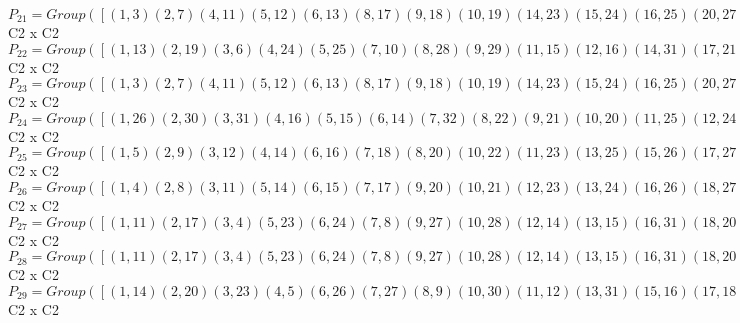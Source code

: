 \documentclass[varwidth=\maxdimen,border=10]{standalone}
\begin{document}
\begin{tabular}
$P_{21} = Group( [ ( 1, 3)( 2, 7)( 4,11)( 5,12)( 6,13)( 8,17)( 9,18)(10,19)(14,23)(15,24)(16,25)(20,27)(21,28)(22,29)(26,31)(30,32), ( 1, 5)( 2, 9)( 3,12)( 4,14)( 6,16)( 7,18)( 8,20)(10,22)(11,23)(13,25)(15,26)(17,27)(19,29)(21,30)(24,31)(28,32) ] )\cong$ C2 x C2\ \\
$P_{22} = Group( [ ( 1,13)( 2,19)( 3, 6)( 4,24)( 5,25)( 7,10)( 8,28)( 9,29)(11,15)(12,16)(14,31)(17,21)(18,22)(20,32)(23,26)(27,30), ( 1, 5)( 2, 9)( 3,12)( 4,14)( 6,16)( 7,18)( 8,20)(10,22)(11,23)(13,25)(15,26)(17,27)(19,29)(21,30)(24,31)(28,32) ] )\cong$ C2 x C2\ \\
$P_{23} = Group( [ ( 1, 3)( 2, 7)( 4,11)( 5,12)( 6,13)( 8,17)( 9,18)(10,19)(14,23)(15,24)(16,25)(20,27)(21,28)(22,29)(26,31)(30,32), ( 1,16)( 2,22)( 3,25)( 4,26)( 5, 6)( 7,29)( 8,30)( 9,10)(11,31)(12,13)(14,15)(17,32)(18,19)(20,21)(23,24)(27,28) ] )\cong$ C2 x C2\ \\
$P_{24} = Group( [ ( 1,26)( 2,30)( 3,31)( 4,16)( 5,15)( 6,14)( 7,32)( 8,22)( 9,21)(10,20)(11,25)(12,24)(13,23)(17,29)(18,28)(19,27), ( 1, 3)( 2, 7)( 4,11)( 5,12)( 6,13)( 8,17)( 9,18)(10,19)(14,23)(15,24)(16,25)(20,27)(21,28)(22,29)(26,31)(30,32) ] )\cong$ C2 x C2\ \\
$P_{25} = Group( [ ( 1, 5)( 2, 9)( 3,12)( 4,14)( 6,16)( 7,18)( 8,20)(10,22)(11,23)(13,25)(15,26)(17,27)(19,29)(21,30)(24,31)(28,32), ( 1, 6)( 2,10)( 3,13)( 4,15)( 5,16)( 7,19)( 8,21)( 9,22)(11,24)(12,25)(14,26)(17,28)(18,29)(20,30)(23,31)(27,32) ] )\cong$ C2 x C2\ \\
$P_{26} = Group( [ ( 1, 4)( 2, 8)( 3,11)( 5,14)( 6,15)( 7,17)( 9,20)(10,21)(12,23)(13,24)(16,26)(18,27)(19,28)(22,30)(25,31)(29,32), ( 1,16)( 2,22)( 3,25)( 4,26)( 5, 6)( 7,29)( 8,30)( 9,10)(11,31)(12,13)(14,15)(17,32)(18,19)(20,21)(23,24)(27,28) ] )\cong$ C2 x C2\ \\
$P_{27} = Group( [ ( 1,11)( 2,17)( 3, 4)( 5,23)( 6,24)( 7, 8)( 9,27)(10,28)(12,14)(13,15)(16,31)(18,20)(19,21)(22,32)(25,26)(29,30), ( 1, 6)( 2,10)( 3,13)( 4,15)( 5,16)( 7,19)( 8,21)( 9,22)(11,24)(12,25)(14,26)(17,28)(18,29)(20,30)(23,31)(27,32) ] )\cong$ C2 x C2\ \\
$P_{28} = Group( [ ( 1,11)( 2,17)( 3, 4)( 5,23)( 6,24)( 7, 8)( 9,27)(10,28)(12,14)(13,15)(16,31)(18,20)(19,21)(22,32)(25,26)(29,30), ( 1, 5)( 2, 9)( 3,12)( 4,14)( 6,16)( 7,18)( 8,20)(10,22)(11,23)(13,25)(15,26)(17,27)(19,29)(21,30)(24,31)(28,32) ] )\cong$ C2 x C2\ \\
$P_{29} = Group( [ ( 1,14)( 2,20)( 3,23)( 4, 5)( 6,26)( 7,27)( 8, 9)(10,30)(11,12)(13,31)(15,16)(17,18)(19,32)(21,22)(24,25)(28,29), ( 1,13)( 2,19)( 3, 6)( 4,24)( 5,25)( 7,10)( 8,28)( 9,29)(11,15)(12,16)(14,31)(17,21)(18,22)(20,32)(23,26)(27,30) ] )\cong$ C2 x C2\ \\

\end{tabular}
\end{document}

